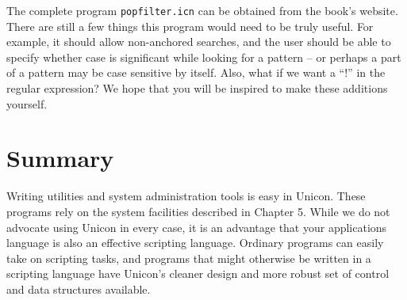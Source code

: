 The complete program \texttt{popfilter.icn} can be obtained from the
book's website. There are still a few things this
program would need to be truly useful. For example, it should allow
non-anchored searches, and the user should be able to specify whether
case is significant while looking for a pattern -- or perhaps a
part of a pattern may be case sensitive by itself. Also, what if
we want a {\textquotedblleft}!{\textquotedblright} in the regular
expression? We hope that you will be inspired to make these
additions yourself.

\section{Summary}

Writing utilities and system administration tools is easy in Unicon.
These programs rely on the system facilities described in
Chapter 5. While we do not advocate using Unicon in every case,
it is an advantage that your applications language is also an
effective scripting language. Ordinary programs can easily take on
scripting tasks, and programs that might otherwise be written in a
scripting language have Unicon's cleaner design and
more robust set of control and data structures available.


\bigskip
